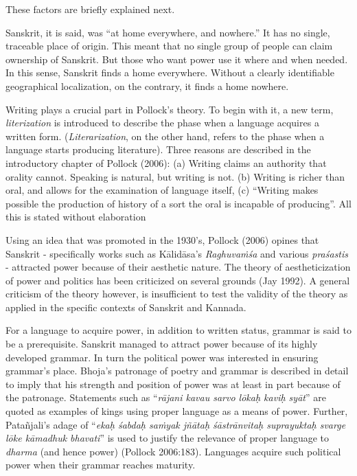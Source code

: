 These factors are briefly explained next. 

Sanskrit, it is said, was “at home everywhere, and nowhere.” It has no single, traceable place of origin. This meant that no single group of people can claim ownership of Sanskrit. But those who want power use it where and when needed. In this sense, Sanskrit finds a home everywhere. Without a clearly identifiable geographical localization, on the contrary, it finds a home nowhere.

Writing plays a crucial part in Pollock’s theory. To begin with it, a new term, {\sl literization} is introduced to describe the phase when a language acquires a written form. ({\sl Literarization}, on the other hand, refers to the phase when a language starts producing literature). Three reasons are described in the introductory chapter of Pollock (2006): (a) Writing claims an authority that orality cannot. Speaking is natural, but writing is not. (b) Writing is richer than oral, and allows for the examination of language itself, (c) “Writing makes possible the production of history of a sort the oral is incapable of producing”. All this is stated without elaboration

Using an idea that was promoted in the 1930’s, Pollock (2006) opines that Sanskrit - specifically works such as Kālidāsa’s {\sl Raghuvaṁśa} and various {\sl praśastis} - attracted power because of their aesthetic nature. The theory of aestheticization of power and politics has been criticized on several grounds (Jay 1992). A general criticism of the theory however, is insufficient to test the validity of the theory as applied in the specific contexts of Sanskrit and Kannada. 

For a language to acquire power, in addition to written status, grammar is said to be a prerequisite. Sanskrit managed to attract power because of its highly developed grammar. In turn the political power was interested in ensuring grammar’s place. Bhoja’s patronage of poetry and grammar is described in detail to imply that his strength and position of power was at least in part because of the patronage. Statements such as “{\sl rājani kavau sarvo lōkaḥ kaviḥ syāt}” are quoted as examples of kings using proper language as a means of power. Further, Patañjali’s adage of “{\sl ekaḥ śabdaḥ saṁyak jñātaḥ śāstrānvitaḥ suprayuktaḥ svarge lōke kāmadhuk bhavati}” is used to justify the relevance of proper language to {\sl dharma} (and hence power) (Pollock 2006:183). Languages acquire such political power when their grammar reaches maturity.

